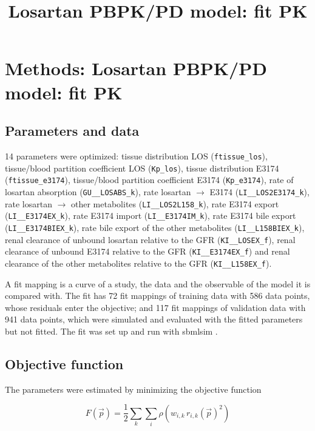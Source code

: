 \documentclass{article}
\title{Losartan PBPK/PD model: fit PK}
\date{}
\begin{document}
\maketitle

\section{Methods: Losartan PBPK/PD model: fit PK}

\subsection{Parameters and data}

14 parameters were optimized: tissue distribution LOS (\texttt{ftissue\_los}), tissue/blood partition coefficient LOS (\texttt{Kp\_los}), tissue distribution E3174 (\texttt{ftissue\_e3174}), tissue/blood partition coefficient E3174 (\texttt{Kp\_e3174}), rate of losartan absorption (\texttt{GU\_\_LOSABS\_k}), rate losartan \ensuremath{\rightarrow} E3174 (\texttt{LI\_\_LOS2E3174\_k}), rate losartan \ensuremath{\rightarrow} other metabolites (\texttt{LI\_\_LOS2L158\_k}), rate E3174 export (\texttt{LI\_\_E3174EX\_k}), rate E3174 import (\texttt{LI\_\_E3174IM\_k}), rate E3174 bile export (\texttt{LI\_\_E3174BIEX\_k}), rate bile export of the other metabolites (\texttt{LI\_\_L158BIEX\_k}), renal clearance of unbound losartan relative to the GFR (\texttt{KI\_\_LOSEX\_f}), renal clearance of unbound E3174 relative to the GFR (\texttt{KI\_\_E3174EX\_f}) and renal clearance of the other metabolites relative to the GFR (\texttt{KI\_\_L158EX\_f}).

A fit mapping is a curve of a study, the data and the observable of the model it is compared with. The fit has 72 fit mappings of training data with 586 data points, whose residuals enter the objective; and 117 fit mappings of validation data with 941 data points, which were simulated and evaluated with the fitted parameters but not fitted. The fit was set up and run with sbmlsim \cite{Koenig2026_sbmlsim}.

\subsection{Objective function}

The parameters were estimated by minimizing the objective function

\begin{equation}
F(\vec{p}) = \frac{1}{2} \sum_{k} \sum_{i} \rho\left(w_{i,k}\, r_{i,k}(\vec{p})^2\right)
\end{equation}
\end{document}
